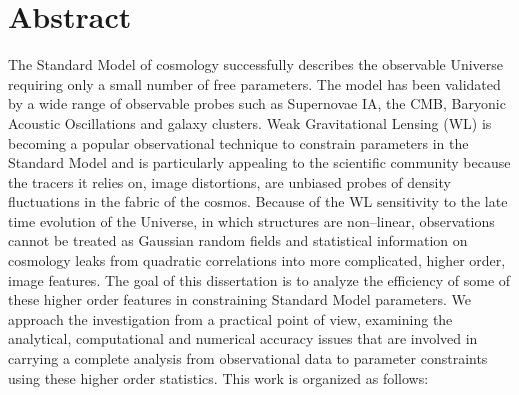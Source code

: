 \chapter*{Abstract} 

The Standard Model of cosmology successfully describes the observable Universe requiring only a small number of free parameters. The model has been validated by a wide range of observable probes such as Supernovae IA, the CMB, Baryonic Acoustic Oscillations and galaxy clusters. Weak Gravitational Lensing (WL) is becoming a popular observational technique to constrain parameters in the Standard Model and is particularly appealing to the scientific community because the tracers it relies on, image distortions, are unbiased probes of density fluctuations in the fabric of the cosmos. Because of the WL sensitivity to the late time evolution of the Universe, in which structures are non--linear, observations cannot be treated as Gaussian random fields and statistical information on cosmology leaks from quadratic correlations into more complicated, higher order, image features. The goal of this dissertation is to analyze the efficiency of some of these higher order features in constraining Standard Model parameters. We approach the investigation from a practical point of view, examining the analytical, computational and numerical accuracy issues that are involved in carrying a complete analysis from observational data to parameter constraints using these higher order statistics. This work is organized as follows:


